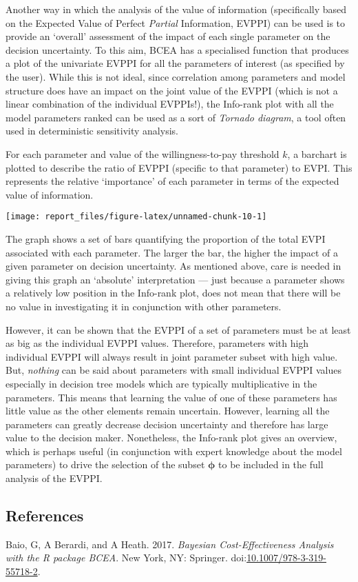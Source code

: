 \documentclass[]{article}
\begin{document}
Another way in which the analysis of the value of information
(specifically based on the Expected Value of Perfect \emph{Partial}
Information, EVPPI) can be used is to provide an `overall' assessment of
the impact of each single parameter on the decision uncertainty. To this
aim, BCEA has a specialised function that produces a plot of the
univariate EVPPI for all the parameters of interest (as specified by the
user). While this is not ideal, since correlation among parameters and
model structure does have an impact on the joint value of the EVPPI
(which is not a linear combination of the individual EVPPIs!), the
Info-rank plot with all the model parameters ranked can be used as a
sort of \emph{Tornado diagram}, a tool often used in deterministic
sensitivity analysis.

For each parameter and value of the willingness-to-pay threshold \(k\),
a barchart is plotted to describe the ratio of EVPPI (specific to that
parameter) to EVPI. This represents the relative `importance' of each
parameter in terms of the expected value of information.

\begin{center}\texttt{[image: report\_files/figure-latex/unnamed-chunk-10-1]} \end{center}

The graph shows a set of bars quantifying the proportion of the total
EVPI associated with each parameter. The larger the bar, the higher the
impact of a given parameter on decision uncertainty. As mentioned above,
care is needed in giving this graph an `absolute' interpretation ---
just because a parameter shows a relatively low position in the
Info-rank plot, does not mean that there will be no value in
investigating it in conjunction with other parameters.

However, it can be shown that the EVPPI of a set of parameters must be
at least as big as the individual EVPPI values. Therefore, parameters
with high individual EVPPI will always result in joint parameter subset
with high value. But, \emph{nothing} can be said about parameters with
small individual EVPPI values especially in decision tree models which
are typically multiplicative in the parameters. This means that learning
the value of one of these parameters has little value as the other
elements remain uncertain. However, learning all the parameters can
greatly decrease decision uncertainty and therefore has large value to
the decision maker. Nonetheless, the Info-rank plot gives an overview,
which is perhaps useful (in conjunction with expert knowledge about the
model parameters) to drive the selection of the subset \(\bm\phi\) to be
included in the full analysis of the EVPPI.

\subsection*{References}\label{references}

\hypertarget{refs}{}
\hypertarget{ref-Baioetal:2017}{}
Baio, G, A Berardi, and A Heath. 2017. \emph{Bayesian Cost-Effectiveness
Analysis with the R package BCEA}. New York, NY: Springer.
doi:\href{https://doi.org/10.1007/978-3-319-55718-2}{10.1007/978-3-319-55718-2}.
\end{document}
